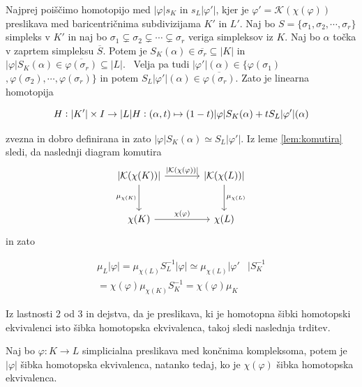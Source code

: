 \documentclass[mat1]{fmfdelo}
\begin{document}
\begin{dokaz}
    Najprej poiščimo homotopijo med $|\varphi|s_K$ in $s_L|\varphi'|$, kjer je $\varphi'=\mathcal{K}(\chi(\varphi))$ preslikava med baricentričnima subdivizijama $K'$ in $L'$.
    Naj bo $S=\{\sigma_1,\sigma_2,\cdots,\sigma_r\}$ simpleks 
    v $K'$ in naj bo $\sigma_1 \subsetneq \sigma_2 \subsetneq 
    \cdots \subsetneq \sigma_r$ veriga simpleksov iz $K$. Naj bo $\alpha$
    točka v zaprtem simpleksu $\overline{S}$. Potem je $S_K(\alpha)
    \in \overline{\sigma_r}\subseteq |K|$ in  $|\varphi|S_K(\alpha) \in 
    \overline{\varphi(\sigma_r)}\subseteq |L|.$ \
    Velja pa tudi $|\varphi'|(\alpha)\in \{\varphi(\sigma_1)$$,\varphi(\sigma_2),\cdots,\varphi(\sigma_r)\}$
    in potem $S_L|\varphi'|(\alpha) \in \overline{\varphi(\sigma_r)}.$ Zato 
    je linearna homotopija

        $$
        H:|K'|\times I \rightarrow |L| \\
        H: (\alpha,t) \mapsto (1-t)|\varphi|S_K(\alpha) + tS_L|\varphi'|(\alpha)\\
        $$

zvezna in dobro definirana in zato $|\varphi|S_K(\alpha) \simeq 
S_L|\varphi'|$. Iz leme \ref{lem:komutira} sledi, da naslednji diagram komutira 
\[\begin{tikzcd}[row sep=large, column sep=large]
    {|\mathcal{K}(\chi(K))|}\arrow{r}
   {|\mathcal{K}(\chi(\varphi))|} \arrow[swap]{d}{\mu_{\chi(K)}} & {|\mathcal{K}(\chi(L))|} \arrow{d}{\mu_{\chi(L)}} \\
   \chi(K) \arrow{r}{\chi(\varphi)} & \chi(L)
   \end{tikzcd}
   \]
in zato

\begin{align*}
    \mu_L|\varphi|=\mu_{\chi(L)}S_L^{-1}|\varphi| \simeq \mu_{\chi(L)}|\varphi'&|S_K^{-1} \\
    =\chi(\varphi)\mu_{\chi(K)}S_K^{-1} =\chi(\varphi)\mu_K&
  \end{align*}
\end{dokaz}

Iz lastnosti 2 od 3 in dejstva, da je preslikava, ki je homotopna šibki homotopski ekvivalenci isto šibka homotopska ekvivalenca, takoj sledi naslednja trditev.

\begin{trditev}
    Naj bo $\varphi : K\rightarrow L$ simplicialna preslikava med končnima kompleksoma, potem je $|\varphi|$ šibka homotopska ekvivalenca, natanko tedaj, ko je $\chi(\varphi)$ šibka homotopska ekvivalenca.
\end{trditev}
\end{document}
